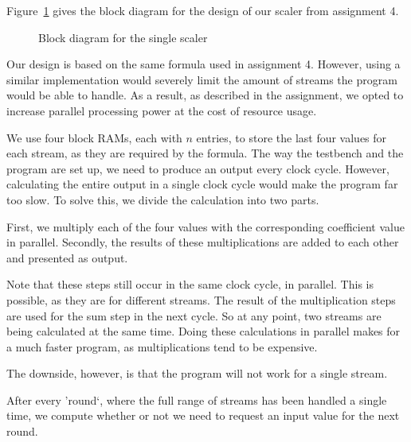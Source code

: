 
Figure~\ref{fig:design:block} gives the block diagram for the design of our scaler from assignment 4.

\begin{figure}[h]
	\centering
	\def\svgwidth{0.6\textwidth}
	
	\caption{Block diagram for the single scaler}
	\label{fig:design:block}
\end{figure}

Our design is based on the same formula used in assignment 4.
However, using a similar implementation would severely limit the amount of streams the program would be able to handle.
As a result, as described in the assignment, we opted to increase parallel processing power at the cost of resource usage.

We use four block RAMs, each with $n$ entries, to store the last four values for each stream, as they are required by the formula.
The way the testbench and the program are set up, we need to produce an output every clock cycle. 
However, calculating the entire output in a single clock cycle would make the program far too slow.
To solve this, we divide the calculation into two parts.

First, we multiply each of the four values with the corresponding coefficient value in parallel.
Secondly, the results of these multiplications are added to each other and presented as output.

Note that these steps still occur in the same clock cycle, in parallel.
This is possible, as they are for different streams.
The result of the multiplication steps are used for the sum step in the next cycle.
So at any point, two streams are being calculated at the same time.
Doing these calculations in parallel makes for a much faster program, as multiplications tend to be expensive.

The downside, however, is that the program will not work for a single stream.

After every 'round`, where the full range of streams has been handled a single time, we compute whether or not we need to request an input value for the next round.
